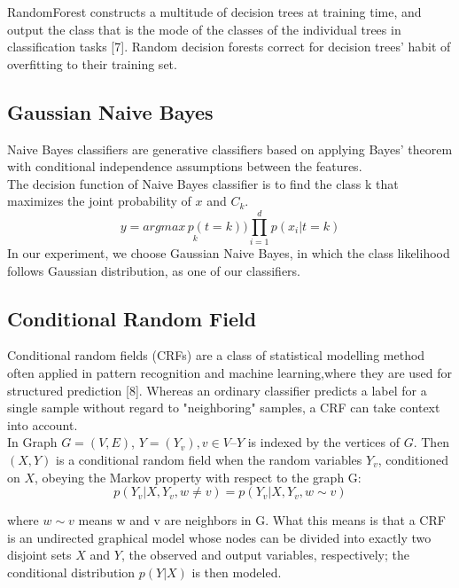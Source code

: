 \documentclass{article} %
\begin{document}
RandomForest constructs a multitude of decision trees at training time, and output the class that is the mode of the classes of the individual trees in classification tasks [7]. Random decision forests correct for decision trees’ habit of overfitting to their training set.

\subsection{Gaussian Naive Bayes}
Naive Bayes classifiers are generative classifiers based on applying Bayes' theorem with conditional independence assumptions between the features.\\

The decision function of Naive Bayes classifier is to find the class k that maximizes the joint probability of $x$ and $C _{k}$.\\
\begin{equation}
y=\underset{k}{argmax\,p(t=k))}\prod_{i=1}^{d}p(x_i|t=k)
\end{equation}
In our experiment, we choose Gaussian Naive Bayes, in which the class likelihood follows Gaussian distribution, as one of our classifiers.

\subsection{Conditional Random Field}
Conditional random fields (CRFs) are a class of statistical modelling method often applied in pattern recognition and machine learning,where they are used for structured prediction [8]. Whereas an ordinary classifier predicts a label for a single sample without regard to "neighboring" samples, a CRF can take context into account.\\

In Graph ${G=(V,E)}$, ${Y=(Y_v), v\in V}$--$Y$ is indexed by the vertices of $G$. Then ${(X,Y)}$ is a conditional random field when the random variables $Y_v$, conditioned on $X$, obeying the Markov property with respect to the graph G: \\
\begin{equation}
p(Y_v|X,Y_v,w\neq v)=p(Y_v|X,Y_v,w\sim v)
\end{equation}

where $w\sim v$ means w and v are neighbors in G. What this means is that a CRF is an undirected graphical model whose nodes can be divided into exactly two disjoint sets $X$ and $Y$, the observed and output variables, respectively; the conditional distribution ${p(Y|X)}$ is then modeled.\\
\end{document}
